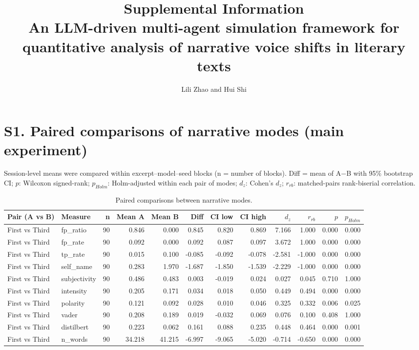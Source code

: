 \documentclass[10pt]{article}
\title{Supplemental Information\\[4pt]\large An LLM-driven multi-agent simulation framework for quantitative analysis of narrative voice shifts in literary texts}
\author{Lili Zhao and Hui Shi}
\date{}
\begin{document}
\maketitle
\section*{S1. Paired comparisons of narrative modes (main experiment)}

Session-level means were compared within excerpt--model--seed blocks (n = number of blocks). Diff = mean of A$-$B with 95\% bootstrap CI; $p$: Wilcoxon signed-rank; $p_{Holm}$: Holm-adjusted within each pair of modes; $d_z$: Cohen's $d_z$; $r_{rb}$: matched-pairs rank-biserial correlation.

{\scriptsize
\begin{longtable}{llrrrrrrrrrr}
\caption{Paired comparisons between narrative modes.}\\
\toprule
Pair (A vs B) & Measure & n & Mean A & Mean B & Diff & CI low & CI high & $d_z$ & $r_{rb}$ & $p$ & $p_{Holm}$ \\
\midrule
\endhead
First vs Third & fp\_ratio & 90 & 0.846 & 0.000 & 0.845 & 0.820 & 0.869 & 7.166 & 1.000 & 0.000 & 0.000 \\
First vs Third & fp\_rate & 90 & 0.092 & 0.000 & 0.092 & 0.087 & 0.097 & 3.672 & 1.000 & 0.000 & 0.000 \\
First vs Third & tp\_rate & 90 & 0.015 & 0.100 & -0.085 & -0.092 & -0.078 & -2.581 & -1.000 & 0.000 & 0.000 \\
First vs Third & self\_name & 90 & 0.283 & 1.970 & -1.687 & -1.850 & -1.539 & -2.229 & -1.000 & 0.000 & 0.000 \\
First vs Third & subjectivity & 90 & 0.486 & 0.483 & 0.003 & -0.019 & 0.024 & 0.027 & 0.045 & 0.710 & 1.000 \\
First vs Third & intensity & 90 & 0.205 & 0.171 & 0.034 & 0.018 & 0.050 & 0.449 & 0.494 & 0.000 & 0.000 \\
First vs Third & polarity & 90 & 0.121 & 0.092 & 0.028 & 0.010 & 0.046 & 0.325 & 0.332 & 0.006 & 0.025 \\
First vs Third & vader & 90 & 0.208 & 0.189 & 0.019 & -0.032 & 0.069 & 0.076 & 0.100 & 0.408 & 1.000 \\
First vs Third & distilbert & 90 & 0.223 & 0.062 & 0.161 & 0.088 & 0.235 & 0.448 & 0.464 & 0.000 & 0.001 \\
First vs Third & n\_words & 90 & 34.218 & 41.215 & -6.997 & -9.065 & -5.020 & -0.714 & -0.650 & 0.000 & 0.000 \\

\end{longtable}}
\end{document}
